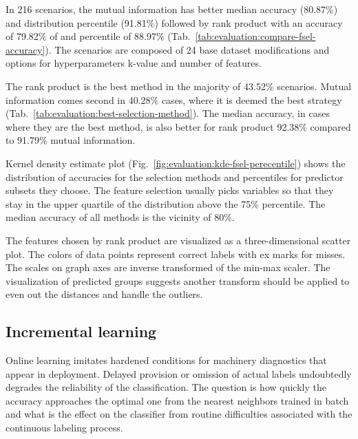 In 216 scenarios, the mutual information has better median accuracy (80.87\%) and distribution percentile (91.81\%) followed by rank product with an accuracy of 79.82\% of and percentile of 88.97\% (Tab.~\ref{tab:evaluation:compare-fsel-accuracy}). The scenarios are composed of 24 base dataset modifications and options for hyperparameters k-value and number of features. 

The rank product is the best method in the majority of 43.52\% scenarios. Mutual information comes second in 40.28\% cases, where it is deemed the best strategy (Tab.~\ref{tab:evaluation:best-selection-method}). The median accuracy, in cases where they are the best method, is also better for rank product 92.38\% compared to 91.79\% mutual information. 

Kernel density estimate plot (Fig.~\ref{fig:evaluation:kde-fsel-perecentile}) shows the distribution of accuracies for the selection methods and percentiles for predictor subsets they choose. The feature selection usually picks variables so that they stay in the upper quartile of the distribution above the 75\% percentile. The median accuracy of all methods is the vicinity of 80\%.

The features chosen by rank product are visualized as a three-dimensional scatter plot. The colors of data points represent correct labels with ex marks for misses. The scales on graph axes are inverse transformed of the min-max scaler. The visualization of predicted groups suggests another transform should be applied to even out the distances and handle the outliers.


\subsection{Incremental learning}
Online learning imitates hardened conditions for machinery diagnostics that appear in deployment. Delayed provision or omission of actual labels undoubtedly degrades the reliability of the classification. The question is how quickly the accuracy approaches the optimal one from the nearest neighbors trained in batch and what is the effect on the classifier from routine difficulties associated with the continuous labeling process.

